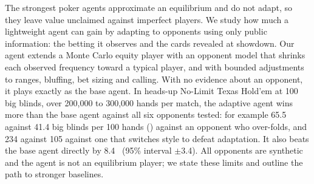 The strongest poker agents approximate an equilibrium and do not adapt, so they leave value
unclaimed against imperfect players. We study how much a lightweight agent can gain by
adapting to opponents using only public information: the betting it observes and the cards
revealed at showdown. Our agent extends a Monte Carlo equity player with an opponent model
that shrinks each observed frequency toward a typical player, and with bounded adjustments
to ranges, bluffing, bet sizing and calling. With no evidence about an opponent, it plays
exactly as the base agent. In heads-up No-Limit Texas Hold'em at 100 big blinds, over
200,000 to 300,000 hands per match, the adaptive agent wins more than the base agent against
all six opponents tested: for example 65.5 against 41.4 big blinds per 100 hands (\bbh)
against an opponent who over-folds, and 234 against 105 against one that switches style to
defeat adaptation. It also beats the base agent directly by 8.4~\bbh{} (95\% interval
$\pm$3.4). All opponents are synthetic and the agent is not an equilibrium player; we state
these limits and outline the path to stronger baselines.
